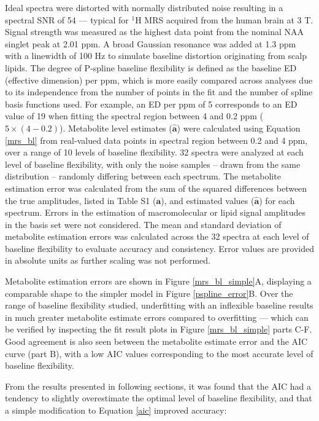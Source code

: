 \documentclass[num-refs]{wiley-article}
\begin{document}
Ideal spectra were distorted with normally distributed noise resulting in a spectral SNR of 54 --- typical for $^1\mathrm{H}$ MRS acquired from the human brain at 3 T. Signal strength was measured as the highest data point from the nominal NAA singlet peak at 2.01 ppm. A broad Gaussian resonance was added at 1.3 ppm with a linewidth of 100 Hz to simulate baseline distortion originating from scalp lipids. The degree of P-spline baseline flexibility is defined as the baseline ED (effective dimension) per ppm, which is more easily compared across analyses due to its independence from the number of points in the fit and the number of spline basis functions used. For example, an ED per ppm of 5 corresponds to an ED value of 19 when fitting the spectral region between 4 and 0.2 ppm ($5 \times (4 - 0.2)$). Metabolite level estimates ($\hat{\mathbf{a}}$) were calculated using Equation \ref{mrs_bl} from real-valued data points in spectral region between 0.2 and 4 ppm, over a range of 10 levels of baseline flexibility. 32 spectra were analyzed at each level of baseline flexibility, with only the noise samples -- drawn from the same distribution -- randomly differing between each spectrum. The metabolite estimation error was calculated from the sum of the squared differences between the true amplitudes, listed in Table S1 ($\mathbf{a}$), and estimated values ($\hat{\mathbf{a}}$) for each spectrum. Errors in the estimation of macromolecular or lipid signal amplitudes in the basis set were not considered. The mean and standard deviation of metabolite estimation errors was calculated across the 32 spectra at each level of baseline flexibility to evaluate accuracy and consistency. Error values are provided in absolute units as further scaling was not performed.

Metabolite estimation errors are shown in Figure \ref{mrs_bl_simple}A, displaying a comparable shape to the simpler model in Figure \ref{pspline_error}B. Over the range of baseline flexibility studied, underfitting with an inflexible baseline results in much greater metabolite estimate errors compared to overfitting --- which can be verified by inspecting the fit result plots in Figure \ref{mrs_bl_simple} parts C-F. Good agreement is also seen between the metabolite estimate error and the AIC curve (part B), with a low AIC values corresponding to the most accurate level of baseline flexibility.

From the results presented in following sections, it was found that the AIC had a tendency to slightly overestimate the optimal level of baseline flexibility, and that a simple modification to Equation \ref{aic} improved accuracy:
\end{document}
